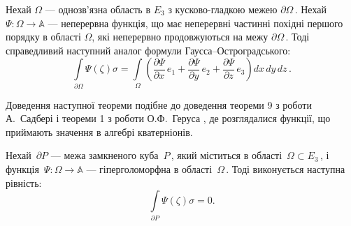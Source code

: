 \documentclass[11pt, reqno]{amsart}
\begin{document}
\begin{theorem}\label{3-3:th-Ostr-Gaus}
Нехай $\Omega$ --- однозв'язна область в $E_3$ з кусково-гладкою межею $\partial \Omega$\,. Нехай\, $\Psi :
\Omega\rightarrow\mathbb{A}$ --- неперервна функція, що має неперервні частинні похідні першого порядку в області
 $\Omega$, які неперервно продовжуються на межу $\partial \Omega$\,. Тоді справедливий наступний аналог
формули Гаусса--Остроградського:
\begin{equation}\label{3-3:form-Ostrogradsky}
\int\limits_{\partial
\Omega}\Psi(\zeta)\sigma=\int\limits_{\Omega}\left(\frac{\partial
\Psi}{\partial x}\,e_1+\frac{\partial \Psi}{\partial
y}\,e_{2}+\frac{\partial \Psi}{\partial
z}\,e_{3}\right)dx\,dy\,dz\,.
\end{equation}
\end{theorem}

\vskip 2mm

Доведення наступної теореми подібне до доведення теореми 9 з роботи
А.~Садбері \cite{Sudbery} і теореми 1 з роботи О.Ф.~Геруса \cite{Gerus-2011},
де розглядалися функції, що приймають значення в алгебрі кватерніонів.


\begin{theorem}\label{teo-Koshi-po-pov}
Нехай \,$\partial P$ --- межа замкненого куба\, $P$\,, який міститься в області\, $\Omega\subset E_3$\,, 
і функція\, $\Psi:\Omega\rightarrow\mathbb{A}$ --- гіперголоморфна в
області\, $\Omega$\,. Тоді виконується наступна рівність:
$$\int\limits_{\partial P}\Psi(\zeta)\sigma=0.$$
\end{theorem}
\end{document}
